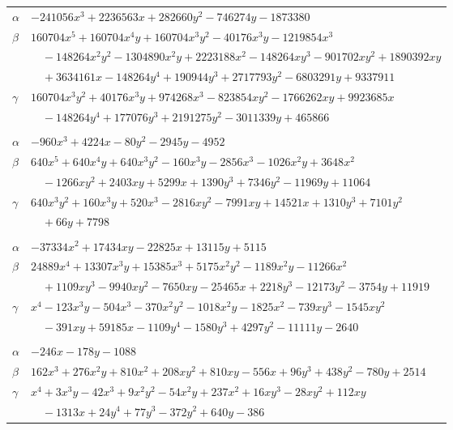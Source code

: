 \documentclass[11pt]{article}
\begin{document}
\begin{longtable}{@{}ll@{}}
$\alpha$ & $-241056x^{3}+2236563x+282660y^{2}-746274y-1873380$\\
$\beta$ & $160704x^{5}+160704x^{4}y+160704x^{3}y^{2}-40176x^{3}y-1219854x^{3}$\\
 & $\quad -148264x^{2}y^{2}-1304890x^{2}y+2223188x^{2}-148264xy^{3}-901702xy^{2}+1890392xy$\\
 & $\quad +3634161x-148264y^{4}+190944y^{3}+2717793y^{2}-6803291y+9337911$\\
$\gamma$ & $160704x^{3}y^{2}+40176x^{3}y+974268x^{3}-823854xy^{2}-1766262xy+9923685x$\\
 & $\quad -148264y^{4}+177076y^{3}+2191275y^{2}-3011339y+465866$\\
\addlinespace[3pt]
\multicolumn{2}{@{}l}{$\{i,j\}=\{1,23\}$, $k_{ij}=2\cdot 3^{5}\cdot 7^{2}$}\\
$\alpha$ & $-960x^{3}+4224x-80y^{2}-2945y-4952$\\
$\beta$ & $640x^{5}+640x^{4}y+640x^{3}y^{2}-160x^{3}y-2856x^{3}-1026x^{2}y+3648x^{2}$\\
 & $\quad -1266xy^{2}+2403xy+5299x+1390y^{3}+7346y^{2}-11969y+11064$\\
$\gamma$ & $640x^{3}y^{2}+160x^{3}y+520x^{3}-2816xy^{2}-7991xy+14521x+1310y^{3}+7101y^{2}$\\
 & $\quad +66y+7798$\\
\addlinespace[3pt]
\multicolumn{2}{@{}l}{$\{i,j\}=\{1,24\}$, $k_{ij}=2^{2}\cdot 3^{5}\cdot 7$}\\
$\alpha$ & $-37334x^{2}+17434xy-22825x+13115y+5115$\\
$\beta$ & $24889x^{4}+13307x^{3}y+15385x^{3}+5175x^{2}y^{2}-1189x^{2}y-11266x^{2}$\\
 & $\quad +1109xy^{3}-9940xy^{2}-7650xy-25465x+2218y^{3}-12173y^{2}-3754y+11919$\\
$\gamma$ & $x^{4}-123x^{3}y-504x^{3}-370x^{2}y^{2}-1018x^{2}y-1825x^{2}-739xy^{3}-1545xy^{2}$\\
 & $\quad -391xy+59185x-1109y^{4}-1580y^{3}+4297y^{2}-11111y-2640$\\
\addlinespace[3pt]
\multicolumn{2}{@{}l}{$\{i,j\}=\{1,87\}$, $k_{ij}=2\cdot 3^{7}$}\\
$\alpha$ & $-246x-178y-1088$\\
$\beta$ & $162x^{3}+276x^{2}y+810x^{2}+208xy^{2}+810xy-556x+96y^{3}+438y^{2}-780y+2514$\\
$\gamma$ & $x^{4}+3x^{3}y-42x^{3}+9x^{2}y^{2}-54x^{2}y+237x^{2}+16xy^{3}-28xy^{2}+112xy$\\
 & $\quad -1313x+24y^{4}+77y^{3}-372y^{2}+640y-386$\\

\end{longtable}
\end{document}

